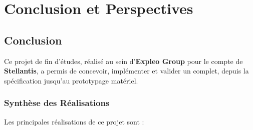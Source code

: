 
\chapter{Conclusion et Perspectives}

\section{Conclusion}

Ce projet de fin d'études, réalisé au sein d'\textbf{Expleo Group} pour le compte de \textbf{Stellantis}, a permis de concevoir, implémenter et valider un  complet, depuis la spécification jusqu'au prototypage matériel.

\subsection{Synthèse des Réalisations}

Les principales réalisations de ce projet sont :


